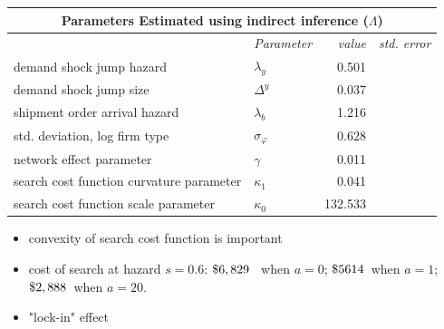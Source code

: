 \documentclass[notes=show]{beamer}
\begin{document}
\begin{frame}%


\begin{center}
{\small 
\begin{tabular}{llrr}
\multicolumn{4}{c}{\textbf{Parameters Estimated using indirect inference (}$%
\Lambda $\textbf{)}} \\ \hline\hline
& \textit{Parameter} & \textit{value} & \textit{std. error} \\ \cline{2-4}
demand shock jump hazard                                     & $\lambda _{y}$       & 0.501    &       \\
demand shock jump size                                       & $\Delta ^{y}$        & 0.037    &       \\
shipment order arrival hazard                                & $\lambda _{b}$       & 1.216    &       \\
std. deviation, log firm type                                & $\sigma _{\varphi }$ & 0.628    &       \\
network effect parameter                                     & $\gamma $            & 0.011    &       \\
\multicolumn{1}{c}{search cost function curvature parameter} & $\kappa _{1}$        & 0.041    &       \\
search cost function scale parameter                         & $\kappa _{0}$        & 132.533  &       \\
\hline
\end{tabular}%
}
\end{center}

\begin{itemize}
\item {\small convexity of search cost function is important}

\item {\small cost of search at hazard }$s=0.6${\small : }${\small \$6,829}$%
{\small \ when }$a=0${\small ; }${\small \$5614}${\small \ when }$a=1${\small ; }${\small \$2,888}${\small \ when } $a=20.$

\item {\small "lock-in" effect}
\end{itemize}

\end{frame}%
\end{document}
